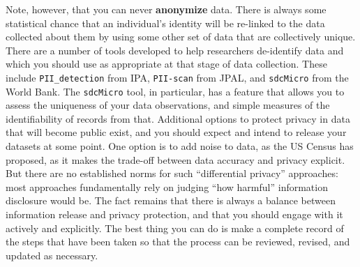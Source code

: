 Note, however, that you can never \textbf{anonymize} data.
There is always some statistical chance that an individual's identity
will be re-linked to the data collected about them
by using some other set of data that are collectively unique.
There are a number of tools developed to help researchers de-identify data
and which you should use as appropriate at that stage of data collection.
These include \texttt{PII\_detection} from IPA,
\texttt{PII-scan} from JPAL,
and \texttt{sdcMicro} from the World Bank.
The \texttt{sdcMicro} tool, in particular, has a feature
that allows you to assess the uniqueness of your data observations,
and simple measures of the identifiability of records from that.
Additional options to protect privacy in data that will become public exist,
and you should expect and intend to release your datasets at some point.
One option is to add noise to data, as the US Census has proposed,
as it makes the trade-off between data accuracy and privacy explicit.
But there are no established norms for such ``differential privacy'' approaches:
most approaches fundamentally rely on judging ``how harmful'' information disclosure would be.
The fact remains that there is always a balance between information release
and privacy protection, and that you should engage with it actively and explicitly.
The best thing you can do is make a complete record of the steps that have been taken
so that the process can be reviewed, revised, and updated as necessary.
